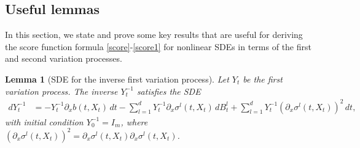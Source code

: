 \documentclass[]{interact}
\newcommand{\1}{\mathbf{1}}
\theoremstyle{plain}%
\newtheorem{lemma}[theorem]{Lemma}
\theoremstyle{definition}
\theoremstyle{remark}
\numberwithin{equation}{section}
\begin{document}


\subsection{Useful lemmas}

In this section, we state and prove some key results that are useful for deriving the 
score function formula \eqref{score}-\eqref{score1} for nonlinear SDEs 
in terms of the first and second variation processes.
%
\begin{lemma}[SDE for the inverse first variation process]
\label{lemma:dYt-inverse}
Let $Y_t$ be the first variation process. The inverse \( Y_t^{-1} \) satisfies the SDE
\begin{align*}
dY_t^{-1} &= - Y_t^{-1} \partial_x b(t, X_t) \, dt - \sum_{l=1}^d Y_t^{-1} \partial_x \sigma^l(t, X_t) \, dB_t^l + \sum_{l=1}^d Y_t^{-1} \left( \partial_x \sigma^l(t, X_t) \right)^2 \, dt,
\end{align*}
with initial condition \( Y_0^{-1} = I_m \), where \( \left( \partial_x \sigma^l(t, X_t) \right)^2 = \partial_x \sigma^l(t, X_t) \partial_x \sigma^l(t, X_t) \).
\end{lemma}
\end{document}
